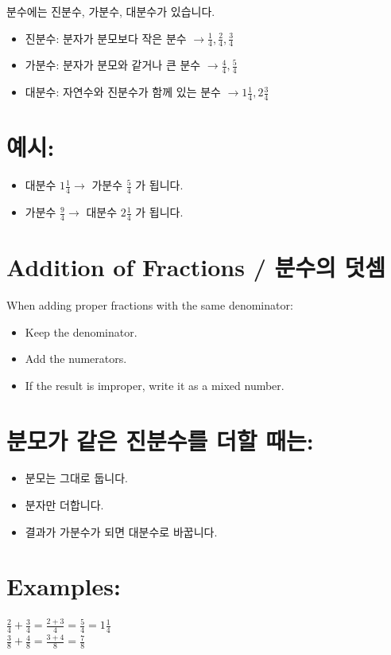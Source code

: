 \documentclass[10pt]{article}
\begin{document}
분수에는 진분수, 가분수, 대분수가 있습니다.

\begin{itemize}
  \item 진분수: 분자가 분모보다 작은 분수 $\rightarrow \frac{1}{4}, \frac{2}{4}, \frac{3}{4}$
  \item 가분수: 분자가 분모와 같거나 큰 분수 $\rightarrow \frac{4}{4}, \frac{5}{4}$
  \item 대분수: 자연수와 진분수가 함께 있는 분수 $\rightarrow 1 \frac{1}{4}, 2 \frac{3}{4}$
\end{itemize}

\section*{예시:}
\begin{itemize}
  \item 대분수 $1 \frac{1}{4} \rightarrow$ 가분수 $\frac{5}{4}$ 가 됩니다.
  \item 가분수 $\frac{9}{4} \rightarrow$ 대분수 $2 \frac{1}{4}$ 가 됩니다.
\end{itemize}

\section*{Addition of Fractions / 분수의 덧셈}
When adding proper fractions with the same denominator:

\begin{itemize}
  \item Keep the denominator.
  \item Add the numerators.
  \item If the result is improper, write it as a mixed number.
\end{itemize}

\section*{분모가 같은 진분수를 더할 때는:}
\begin{itemize}
  \item 분모는 그대로 둡니다.
  \item 분자만 더합니다.
  \item 결과가 가분수가 되면 대분수로 바꿉니다.
\end{itemize}

\section*{Examples:}
$\frac{2}{4}+\frac{3}{4}=\frac{2+3}{4}=\frac{5}{4}=1 \frac{1}{4}$\\
$\frac{3}{8}+\frac{4}{8}=\frac{3+4}{8}=\frac{7}{8}$
\end{document}
